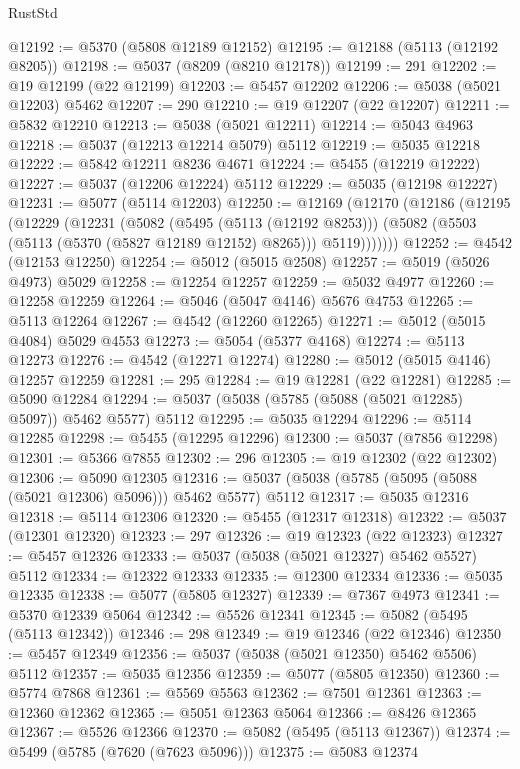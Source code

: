\begin{lexlean}{RustStd}
\begin{coremodule}
@12192 := @5370 (@5808 @12189 @12152)
@12195 := @12188 (@5113 (@12192 @8205))
@12198 := @5037 (@8209 (@8210 @12178))
@12199 := 291
@12202 := @19 @12199 (@22 @12199)
@12203 := @5457 @12202
@12206 := @5038 (@5021 @12203) @5462
@12207 := 290
@12210 := @19 @12207 (@22 @12207)
@12211 := @5832 @12210
@12213 := @5038 (@5021 @12211)
@12214 := @5043 @4963
@12218 := @5037 (@12213 @12214 @5079) @5112
@12219 := @5035 @12218
@12222 := @5842 @12211 @8236 @4671
@12224 := @5455 (@12219 @12222)
@12227 := @5037 (@12206 @12224) @5112
@12229 := @5035 (@12198 @12227)
@12231 := @5077 (@5114 @12203)
@12250 := @12169
    (@12170
      (@12186
        (@12195
          (@12229
            (@12231
              (@5082
                (@5495 (@5113 (@12192 @8253)))
                (@5082 (@5503 (@5113 (@5370 (@5827 @12189 @12152) @8265))) @5119)))))))
@12252 := @4542 (@12153 @12250)
@12254 := @5012 (@5015 @2508)
@12257 := @5019 (@5026 @4973) @5029
@12258 := @12254 @12257
@12259 := @5032 @4977
@12260 := @12258 @12259
@12264 := @5046 (@5047 @4146) @5676 @4753
@12265 := @5113 @12264
@12267 := @4542 (@12260 @12265)
@12271 := @5012 (@5015 @4084) @5029 @4553
@12273 := @5054 (@5377 @4168)
@12274 := @5113 @12273
@12276 := @4542 (@12271 @12274)
@12280 := @5012 (@5015 @4146) @12257 @12259
@12281 := 295
@12284 := @19 @12281 (@22 @12281)
@12285 := @5090 @12284
@12294 := @5037 (@5038 (@5785 (@5088 (@5021 @12285) @5097)) @5462 @5577) @5112
@12295 := @5035 @12294
@12296 := @5114 @12285
@12298 := @5455 (@12295 @12296)
@12300 := @5037 (@7856 @12298)
@12301 := @5366 @7855
@12302 := 296
@12305 := @19 @12302 (@22 @12302)
@12306 := @5090 @12305
@12316 := @5037 (@5038 (@5785 (@5095 (@5088 (@5021 @12306) @5096))) @5462 @5577) @5112
@12317 := @5035 @12316
@12318 := @5114 @12306
@12320 := @5455 (@12317 @12318)
@12322 := @5037 (@12301 @12320)
@12323 := 297
@12326 := @19 @12323 (@22 @12323)
@12327 := @5457 @12326
@12333 := @5037 (@5038 (@5021 @12327) @5462 @5527) @5112
@12334 := @12322 @12333
@12335 := @12300 @12334
@12336 := @5035 @12335
@12338 := @5077 (@5805 @12327)
@12339 := @7367 @4973
@12341 := @5370 @12339 @5064
@12342 := @5526 @12341
@12345 := @5082 (@5495 (@5113 @12342))
@12346 := 298
@12349 := @19 @12346 (@22 @12346)
@12350 := @5457 @12349
@12356 := @5037 (@5038 (@5021 @12350) @5462 @5506) @5112
@12357 := @5035 @12356
@12359 := @5077 (@5805 @12350)
@12360 := @5774 @7868
@12361 := @5569 @5563
@12362 := @7501 @12361
@12363 := @12360 @12362
@12365 := @5051 @12363 @5064
@12366 := @8426 @12365
@12367 := @5526 @12366
@12370 := @5082 (@5495 (@5113 @12367))
@12374 := @5499 (@5785 (@7620 (@7623 @5096)))
@12375 := @5083 @12374

\end{coremodule}
\end{lexlean}
